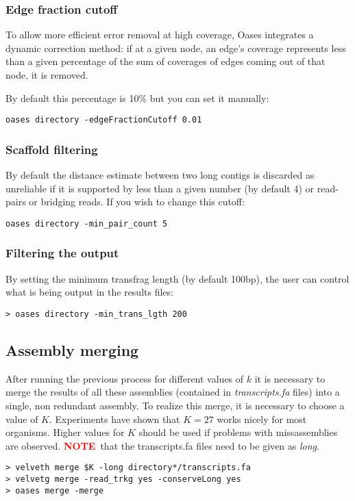 \documentclass[12pt]{article}
\newcommand{\NOTE}{\textcolor{red}{\textbf{NOTE}}}
\begin{document}
\subsubsection{Edge fraction cutoff}

To allow more efficient error removal at high coverage, Oases integrates a dynamic correction method: if at a given node, an edge's coverage represents less than a given percentage of the sum of coverages of edges coming out of that node, it is removed.

By default this percentage is 10\% but you can set it manually:

\begin{verbatim}
oases directory -edgeFractionCutoff 0.01
\end{verbatim}

\subsubsection{Scaffold filtering}

By default the distance estimate between two long contigs is discarded as unreliable if it is supported by less than a given number (by default 4) or read-pairs or bridging reads. If you wish to change this cutoff:

\begin{verbatim}
oases directory -min_pair_count 5
\end{verbatim}

\subsubsection{Filtering the output}\label{filtering}

By setting the minimum transfrag length (by default 100bp), the user can control what is being output in the results files:

\begin{verbatim}
> oases directory -min_trans_lgth 200
\end{verbatim}

\subsection{Assembly merging}

After running the previous process for different values of $k$ it is necessary to merge the results of all these assemblies (contained in \emph{transcripts.fa} files) into a single, non redundant assembly. To realize this merge, it is necessary to choose a value of $K$. Experiments have shown that $K=27$ works nicely for most organisms. Higher values for $K$ should be used if problems with missassemblies are observed.
\NOTE \ that the transcripts.fa files need to be given as \emph{long}.
\begin{verbatim}
> velveth merge $K -long directory*/transcripts.fa
> velvetg merge -read_trkg yes -conserveLong yes
> oases merge -merge
\end{verbatim}
\end{document}
